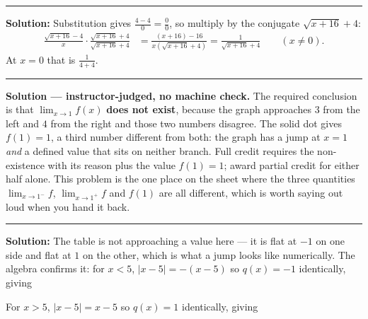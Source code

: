\documentclass[12pt]{article}
\begin{document}
\vspace{0.2cm}\noindent\rule{\linewidth}{0.2pt}\vspace{0.2cm}


\textbf{Solution:} Substitution gives $\frac{4-4}{0} = \frac{0}{0}$, so multiply
by the conjugate $\sqrt{x+16}+4$:
\begin{align*}
  \frac{\sqrt{x+16}-4}{x}\cdot\frac{\sqrt{x+16}+4}{\sqrt{x+16}+4}
    &= \frac{(x+16)-16}{x\left(\sqrt{x+16}+4\right)}
     = \frac{1}{\sqrt{x+16}+4} \qquad (x \neq 0).
\end{align*}
At $x = 0$ that is $\frac{1}{4+4}$. 

\vspace{0.2cm}\noindent\rule{\linewidth}{0.2pt}\vspace{0.2cm}


\textbf{Solution --- instructor-judged, no machine check.} The required
conclusion is that $\lim_{x\to1} f(x)$ \textbf{does not exist}, because the
graph approaches $3$ from the left and $4$ from the right and those two numbers
disagree. The solid dot gives $f(1) = 1$, a third number different from both:
the graph has a jump at $x = 1$ \emph{and} a defined value that sits on neither
branch. Full credit requires the non-existence with its reason plus the value
$f(1) = 1$; award partial credit for either half alone. This problem is the one
place on the sheet where the three quantities
$\lim_{x\to1^-} f$, $\lim_{x\to1^+} f$ and $f(1)$ are all different, which is
worth saying out loud when you hand it back.

\vspace{0.2cm}\noindent\rule{\linewidth}{0.2pt}\vspace{0.2cm}


\textbf{Solution:} The table is not approaching a value here --- it is flat at
$-1$ on one side and flat at $1$ on the other, which is what a jump looks like
numerically. The algebra confirms it: for $x < 5$, $|x-5| = -(x-5)$ so
$q(x) = -1$ identically, giving 

For $x > 5$, $|x-5| = x-5$ so $q(x) = 1$ identically, giving 
\end{document}
